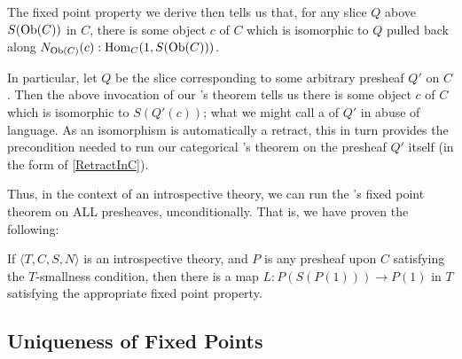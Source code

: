 The fixed point property we derive then tells us that, for any slice $Q$ above $S(\operatorname{Ob}(C))$ in $C$, there is some object $c$ of $C$ which is isomorphic to $Q$ pulled back along $N_{\operatorname{Ob}(C)}(c) : \operatorname{Hom}_C(1, S(\operatorname{Ob}(C)))$. 

In particular, let $Q$ be the slice corresponding to some arbitrary presheaf $Q'$ on $C$. Then the above invocation of our \Loeb's theorem tells us there is some object $c$ of $C$ which is isomorphic to $S(Q'(c))$; what we might call a  of $Q'$ in abuse of language. As an isomorphism is automatically a retract, this in turn provides the precondition needed to run our categorical \Loeb's theorem on the presheaf $Q'$ itself (in the form of \cref{RetractInC}).

Thus, in the context of an introspective theory, we can run the \Loeb's fixed point theorem on ALL presheaves, unconditionally. That is, we have proven the following:

\begin{corollary}\label{LoebInIntrosp}
If $\langle T, C, S, N \rangle$ is an introspective theory, and $P$ is any presheaf upon $C$ satisfying the $T$-smallness condition, then there is a map $L : P(S(P(1))) \to P(1)$ in $T$ satisfying the appropriate fixed point property.
\end{corollary}

\subsection{Uniqueness of Fixed Points}

